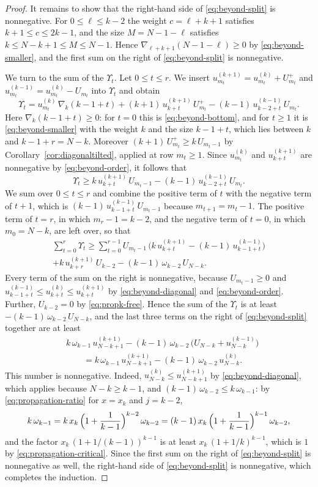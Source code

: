 \documentclass{amsart}
\theoremstyle{definition}
\theoremstyle{remark}
\numberwithin{equation}{section}
\begin{document}
\begin{proof}
It remains to show that the right-hand side of \eqref{eq:beyond-split} is
nonnegative. For
$0\le\ell\le k-2$ the weight $c=\ell+k+1$ satisfies $k+1\le c\le2k-1$, and
the size $M=N-1-\ell$ satisfies $k\le N-k+1\le M\le N-1$. Hence
$\nabla_{\ell+k+1}(N-1-\ell)\ge0$ by \eqref{eq:beyond-smaller}, and the
first sum on the right of \eqref{eq:beyond-split} is nonnegative.

We turn to the sum of the $\Upsilon_t$. Let $0\le t\le r$. We insert
$u^{(k+1)}_{m_t}=u^{(k)}_{m_t}+U^{+}_{m_t}$ and
$u^{(k-1)}_{m_t}=u^{(k)}_{m_t}-U_{m_t}$ into $\Upsilon_t$ and obtain
\[
\Upsilon_t=u^{(k)}_{m_t}\,\nabla_k(k-1+t)
+(k+1)\,u^{(k+1)}_{k+t}\,U^{+}_{m_t}
-(k-1)\,u^{(k-1)}_{k-2+t}\,U_{m_t} .
\]
Here $\nabla_k(k-1+t)\ge0$: for $t=0$ this is \eqref{eq:beyond-bottom}, and
for $t\ge1$ it is \eqref{eq:beyond-smaller} with the weight $k$ and the size
$k-1+t$, which lies between $k$ and $k-1+r=N-k$. Moreover
$(k+1)\,U^{+}_{m_t}\ge k\,U_{m_t-1}$ by Corollary~\ref{cor:diagonaltilted},
applied at row $m_t\ge1$. Since $u^{(k)}_{m_t}$ and $u^{(k+1)}_{k+t}$ are
nonnegative by \eqref{eq:beyond-order}, it follows that
\[
\Upsilon_t\ge k\,u^{(k+1)}_{k+t}\,U_{m_t-1}
-(k-1)\,u^{(k-1)}_{k-2+t}\,U_{m_t} .
\]
We sum over $0\le t\le r$ and combine the positive term of $t$ with the
negative term of $t+1$, which is $(k-1)\,u^{(k-1)}_{k-1+t}\,U_{m_t-1}$
because $m_{t+1}=m_t-1$. The positive term of $t=r$, in which $m_r-1=k-2$,
and the negative term of $t=0$, in which $m_0=N-k$, are left over, so that
\begin{multline*}
\sum_{t=0}^{r}\Upsilon_t\ge\sum_{t=0}^{r-1}U_{m_t-1}\,
\bigl(k\,u^{(k+1)}_{k+t}-(k-1)\,u^{(k-1)}_{k-1+t}\bigr)\\
+k\,u^{(k+1)}_{k+r}\,U_{k-2}-(k-1)\,\omega_{k-2}\,U_{N-k} .
\end{multline*}
Every term of the sum on the right is nonnegative, because
$U_{m_t-1}\ge0$ and
$u^{(k-1)}_{k-1+t}\le u^{(k)}_{k+t}\le u^{(k+1)}_{k+t}$ by
\eqref{eq:beyond-diagonal} and \eqref{eq:beyond-order}. Further,
$U_{k-2}=0$ by \eqref{eq:propk-free}. Hence the sum of the
$\Upsilon_t$ is at least $-(k-1)\,\omega_{k-2}\,U_{N-k}$, and the last three
terms on the right of \eqref{eq:beyond-split} together are at least
\begin{align*}
&k\,\omega_{k-1}\,u^{(k+1)}_{N-k+1}
-(k-1)\,\omega_{k-2}\,\bigl(U_{N-k}+u^{(k-1)}_{N-k}\bigr)\\
&\qquad=k\,\omega_{k-1}\,u^{(k+1)}_{N-k+1}
-(k-1)\,\omega_{k-2}\,u^{(k)}_{N-k} .
\end{align*}
This number is nonnegative. Indeed,
$u^{(k)}_{N-k}\le u^{(k+1)}_{N-k+1}$ by \eqref{eq:beyond-diagonal}, which
applies because $N-k\ge k-1$, and
$(k-1)\,\omega_{k-2}\le k\,\omega_{k-1}$: by \eqref{eq:propagation-ratio}
for $x=x_k$ and $j=k-2$,
\[
k\,\omega_{k-1}=k\,x_k\,\Bigl(1+\frac{1}{k-1}\Bigr)^{k-2}\,\omega_{k-2}
=(k-1)\,x_k\,\Bigl(1+\frac{1}{k-1}\Bigr)^{k-1}\,\omega_{k-2},
\]
and the factor $x_k\,(1+1/(k-1))^{k-1}$ is at least
$x_k\,(1+1/k)^{k-1}$, which is $1$ by \eqref{eq:propagation-critical}. Since
the first sum on the right of \eqref{eq:beyond-split} is nonnegative as
well, the right-hand side of \eqref{eq:beyond-split} is nonnegative, which
completes the induction.
\end{proof}
\end{document}
